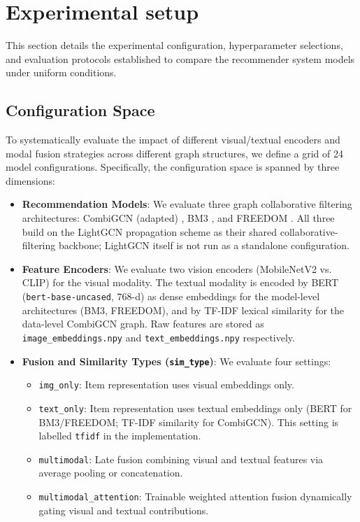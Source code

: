 \section{Experimental setup}

This section details the experimental configuration, hyperparameter selections, and evaluation protocols established to compare the recommender system models under uniform conditions.

\subsection{Configuration Space}

To systematically evaluate the impact of different visual/textual encoders and modal fusion strategies across different graph structures, we define a grid of 24 model configurations. Specifically, the configuration space is spanned by three dimensions:
\begin{itemize}
    \item \textbf{Recommendation Models}: We evaluate three graph collaborative filtering architectures: CombiGCN (adapted) \parencite{10.1007/978-981-97-0669-3_11}, BM3 \parencite{10.1145/3543507.3583251}, and FREEDOM \parencite{Zhou_2023}. All three build on the LightGCN \parencite{he2020lightgcnsimplifyingpoweringgraph} propagation scheme as their shared collaborative-filtering backbone; LightGCN itself is not run as a standalone configuration.
    \item \textbf{Feature Encoders}: We evaluate two vision encoders (MobileNetV2 vs. CLIP) for the visual modality. The textual modality is encoded by BERT (\texttt{bert-base-uncased}, $768$-d) as dense embeddings for the model-level architectures (BM3, FREEDOM), and by TF-IDF lexical similarity for the data-level CombiGCN graph. Raw features are stored as \texttt{image\_embeddings.npy} and \texttt{text\_embeddings.npy} respectively.
    \item \textbf{Fusion and Similarity Types (\texttt{sim\_type})}: We evaluate four settings:
    \begin{itemize}
        \item \texttt{img\_only}: Item representation uses visual embeddings only.
        \item \texttt{text\_only}: Item representation uses textual embeddings only (BERT for BM3/FREEDOM; TF-IDF similarity for CombiGCN). This setting is labelled \texttt{tfidf} in the implementation.
        \item \texttt{multimodal}: Late fusion combining visual and textual features via average pooling or concatenation.
        \item \texttt{multimodal\_attention}: Trainable weighted attention fusion dynamically gating visual and textual contributions.
    \end{itemize}
\end{itemize}

